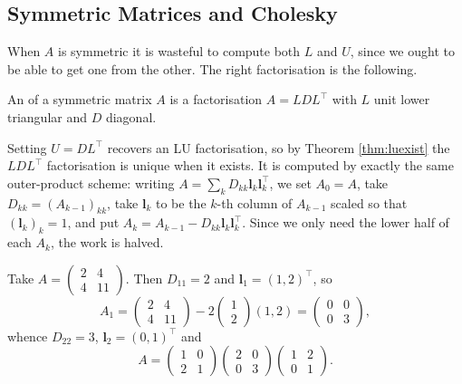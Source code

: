 \subsection{Symmetric Matrices and Cholesky}

When $A$ is symmetric it is wasteful to compute both $L$ and $U$, since we ought to be able to get one from the other. The right factorisation is the following.

\begin{definition}
  An  of a symmetric matrix $A$ is a factorisation $A = LDL^\top$ with $L$ unit lower triangular and $D$ diagonal.
\end{definition}

Setting $U = DL^\top$ recovers an LU factorisation, so by Theorem \ref{thm:luexist} the $LDL^\top$ factorisation is unique when it exists. It is computed by exactly the same outer-product scheme: writing $A = \sum_k D_{kk}\mathbf{l}_k\mathbf{l}_k^\top$, we set $A_0 = A$, take $D_{kk} = (A_{k-1})_{kk}$, take $\mathbf{l}_k$ to be the $k$-th column of $A_{k-1}$ scaled so that $(\mathbf{l}_k)_k = 1$, and put $A_k = A_{k-1} - D_{kk}\mathbf{l}_k\mathbf{l}_k^\top$. Since we only need the lower half of each $A_k$, the work is halved.

\begin{example}
  Take $A = \begin{pmatrix}2&4\\4&11\end{pmatrix}$. Then $D_{11} = 2$ and $\mathbf{l}_1 = (1,2)^\top$, so
  $$
  A_1 = \begin{pmatrix}2&4\\4&11\end{pmatrix} - 2\begin{pmatrix}1\\2\end{pmatrix}(1,2) = \begin{pmatrix}0&0\\0&3\end{pmatrix},
  $$
  whence $D_{22} = 3$, $\mathbf{l}_2 = (0,1)^\top$ and
  $$
  A = \begin{pmatrix}1&0\\2&1\end{pmatrix}\begin{pmatrix}2&0\\0&3\end{pmatrix}\begin{pmatrix}1&2\\0&1\end{pmatrix}.
  $$
\end{example}

